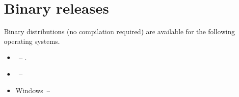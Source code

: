 
%
%
%


\chapter{Binary releases}\label{chap:bin}

Binary distributions (no compilation required) are available for the following operating systems.
\begin{itemize}
 \item \linux~-- .
 \item \macosx~-- 
 \item Windows~-- 
\end{itemize}


